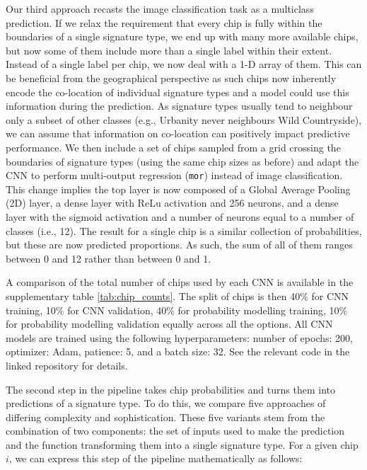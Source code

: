 Our third approach recasts the image classification task as a multiclass
prediction. If we relax the requirement that every chip is fully within
the boundaries of a single signature type, we end up with many more available
chips, but now some of them include more than a single label within their
extent. Instead of a single label per chip, we now deal with a 1-D array of them.
This can be beneficial from the geographical perspective as such chips now inherently
encode the co-location of individual signature types and a model could use this information
during the prediction. As signature types usually tend to neighbour only a subset of
other classes (e.g., Urbanity never neighbours Wild Countryside), we can assume that
information on co-location can positively impact predictive performance. We
then include a set of chips sampled from a grid crossing the boundaries of
signature types (using the same chip sizes as before) and adapt the CNN to
perform multi-output regression (\texttt{mor}) instead of image classification. This change
implies the top layer is now composed of a Global Average Pooling (2D) layer, a
dense layer with ReLu
activation and 256 neurons, and a dense layer with the sigmoid activation and a number of
neurons equal to a number of classes (i.e., 12). The result for a single chip is a similar
collection of probabilities, but these are now predicted proportions. As such,
the sum of all of them ranges between 0 and 12 rather than between 0 and 1.

A comparison of the total
number of chips used by each CNN is available in the supplementary table \ref{tab:chip_counts}.
The split of chips is then 40\% for CNN training, 10\% for CNN validation, 40\% for
probability modelling training, 10\% for probability modelling validation equally across all the options.
All CNN models are trained using the following hyperparameters: number of
epochs: 200, optimizer: Adam, patience: 5, and a batch size: 32. See the relevant code
in the linked repository for details.

The second step in the pipeline takes chip probabilities and turns them into
predictions of a signature type. To do this, we compare five approaches of
differing complexity and sophistication. These five variants stem from the
combination of two components: the set of inputs used to make the prediction and
the function transforming them into a single signature type. For a given chip
$i$, we can express this step of the pipeline mathematically as follows:


